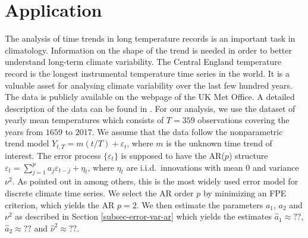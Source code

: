 \section{Application}\label{sec-data}


The analysis of time trends in long temperature records is an important task in climatology. Information on the shape of the trend is needed in order to better understand long-term climate variability. The Central England temperature record is the longest instrumental temperature time series in the world. It is a valuable asset for analysing climate variability over the last few hundred years. The data is publicly available on the webpage of the UK Met Office. A detailed description of the data can be found in \cite{Parker1992}. For our analysis, we use the dataset of yearly mean temperatures which consists of $T=359$ observations covering the years from $1659$ to $2017$. We assume that the data follow the nonparametric trend model $Y_{t,T} = m(t/T) + \varepsilon_t$, where $m$ is the unknown time trend of interest. The error process $\{ \varepsilon_t \}$ is supposed to have the AR($p$) structure $\varepsilon_t = \sum_{j=1}^p a_j \varepsilon_{t-j} + \eta_t$, where $\eta_t$ are i.i.d.\ innovations with mean $0$ and variance $\nu^2$. As pointed out in \cite{Mudelsee2010} among others, this is the most widely used error model for discrete climate time series. We select the AR order $p$ by minimizing an FPE criterion, which yields the AR $p=2$. We then estimate the parameters $a_1$, $a_2$ and $\nu^2$ as described in Section \ref{subsec-error-var-ar} which yields the estimates $\widehat{a}_1 \approx ??$, $\widehat{a}_2 \approx ??$ and $\widehat{\nu}^2 \approx ??$.


